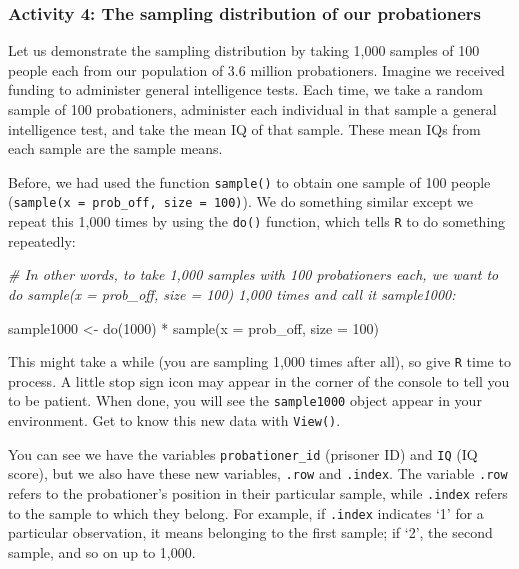 \documentclass[
]{book}
\newenvironment{Shaded}{\begin{snugshade}}{\end{snugshade}}
\newcommand{\AttributeTok}[1]{\textcolor[rgb]{0.77,0.63,0.00}{#1}}
\newcommand{\CommentTok}[1]{\textcolor[rgb]{0.56,0.35,0.01}{\textit{#1}}}
\newcommand{\DecValTok}[1]{\textcolor[rgb]{0.00,0.00,0.81}{#1}}
\newcommand{\FunctionTok}[1]{\textcolor[rgb]{0.00,0.00,0.00}{#1}}
\newcommand{\NormalTok}[1]{#1}
\newcommand{\OtherTok}[1]{\textcolor[rgb]{0.56,0.35,0.01}{#1}}
\newcommand{\SpecialCharTok}[1]{\textcolor[rgb]{0.00,0.00,0.00}{#1}}
\begin{document}
\hypertarget{activity-4-the-sampling-distribution-of-our-probationers}{%
\subsubsection{Activity 4: The sampling distribution of our probationers}\label{activity-4-the-sampling-distribution-of-our-probationers}}

Let us demonstrate the sampling distribution by taking 1,000 samples of 100 people each from our population of 3.6 million probationers. Imagine we received funding to administer general intelligence tests. Each time, we take a random sample of 100 probationers, administer each individual in that sample a general intelligence test, and take the mean IQ of that sample. These mean IQs from each sample are the sample means.

Before, we had used the function \texttt{sample()} to obtain one sample of 100 people (\texttt{sample(x\ =\ prob\_off,\ size\ =\ 100)}). We do something similar except we repeat this 1,000 times by using the \texttt{do()} function, which tells \texttt{R} to do something repeatedly:

\begin{Shaded}
\begin{Highlighting}[]
\CommentTok{\# In other words, to take 1,000 samples with 100 probationers each, we want to \textquotesingle{}do\textquotesingle{} \textasciigrave{}sample(x = prob\_off, size = 100)\textasciigrave{} 1,000 times and call it \textquotesingle{}sample1000\textquotesingle{}: }

\NormalTok{sample1000 }\OtherTok{\textless{}{-}} \FunctionTok{do}\NormalTok{(}\DecValTok{1000}\NormalTok{) }\SpecialCharTok{*} \FunctionTok{sample}\NormalTok{(}\AttributeTok{x =}\NormalTok{ prob\_off, }\AttributeTok{size =} \DecValTok{100}\NormalTok{)}
\end{Highlighting}
\end{Shaded}

This might take a while (you are sampling 1,000 times after all), so give \texttt{R} time to process. A little stop sign icon may appear in the corner of the console to tell you to be patient. When done, you will see the \texttt{sample1000} object appear in your environment. Get to know this new data with \texttt{View()}.

You can see we have the variables \texttt{probationer\_id} (prisoner ID) and \texttt{IQ} (IQ score), but we also have these new variables, \texttt{.row} and \texttt{.index}. The variable \texttt{.row} refers to the probationer's position in their particular sample, while \texttt{.index} refers to the sample to which they belong. For example, if \texttt{.index} indicates `1' for a particular observation, it means belonging to the first sample; if `2', the second sample, and so on up to 1,000.
\end{document}
